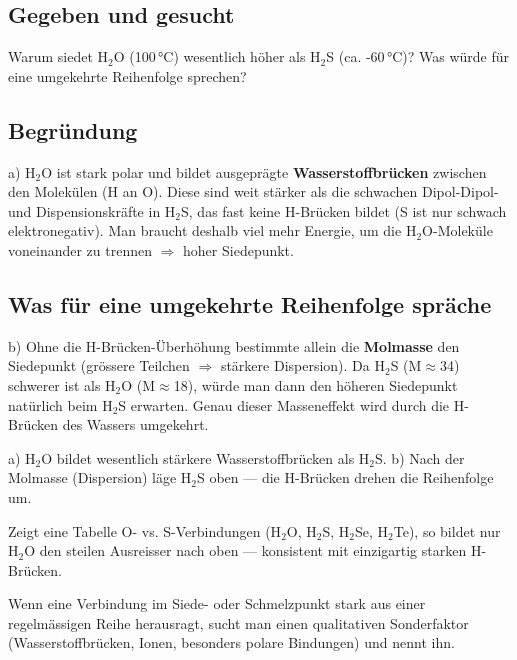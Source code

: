 
\subsection*{Gegeben und gesucht}
Warum siedet H$_2$O (100\,°C) wesentlich höher als H$_2$S (ca. -60\,°C)?
Was würde für eine umgekehrte Reihenfolge sprechen?

\subsection*{Begründung}
a) H$_2$O ist stark polar und bildet ausgeprägte \textbf{Wasserstoffbrücken}
zwischen den Molekülen (H an O). Diese sind weit stärker als die schwachen
Dipol-Dipol- und Dispensionskräfte in H$_2$S, das fast keine H-Brücken bildet
(S ist nur schwach elektronegativ). Man braucht deshalb viel mehr Energie,
um die H$_2$O-Moleküle voneinander zu trennen $\Rightarrow$ hoher Siedepunkt.

\subsection*{Was für eine umgekehrte Reihenfolge spräche}
b) Ohne die H-Brücken-Überhöhung bestimmte allein die \textbf{Molmasse} den
Siedepunkt (grössere Teilchen $\Rightarrow$ stärkere Dispersion). Da H$_2$S
(M$\approx$34) schwerer ist als H$_2$O (M$\approx$18), würde man dann den
höheren Siedepunkt natürlich beim H$_2$S erwarten. Genau dieser
Masseneffekt wird durch die H-Brücken des Wassers umgekehrt.

\begin{ergebnis}
a) H$_2$O bildet wesentlich stärkere Wasserstoffbrücken als H$_2$S.
b) Nach der Molmasse (Dispersion) läge H$_2$S oben --- die H-Brücken drehen
die Reihenfolge um.
\end{ergebnis}

\begin{kontrolle}
Zeigt eine Tabelle O- vs. S-Verbindungen (H$_2$O, H$_2$S, H$_2$Se, H$_2$Te),
so bildet nur H$_2$O den steilen Ausreisser nach oben --- konsistent mit
einzigartig starken H-Brücken.
\end{kontrolle}

\begin{merksatz}
Wenn eine Verbindung im Siede- oder Schmelzpunkt stark aus einer regelmässigen
Reihe herausragt, sucht man einen qualitativen Sonderfaktor
(Wasserstoffbrücken, Ionen, besonders polare Bindungen) und nennt ihn.
\end{merksatz}
